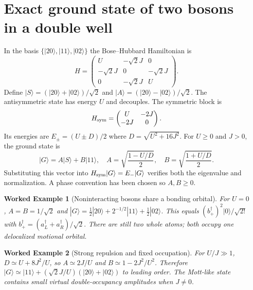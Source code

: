\documentclass[11pt,a4paper]{article}
\newtheorem{example}{Worked Example}
\begin{document}
\section{Exact ground state of two bosons in a double well}
In the basis $\{|20\rangle,|11\rangle,|02\rangle\}$ the Bose--Hubbard Hamiltonian is
\begin{equation}H=\begin{pmatrix}U&-\sqrt2J&0\\-\sqrt2J&0&-\sqrt2J\\0&-\sqrt2J&U\end{pmatrix}.\end{equation}
Define $|S\rangle=(|20\rangle+|02\rangle)/\sqrt2$ and $|A\rangle=(|20\rangle-|02\rangle)/\sqrt2$. The antisymmetric state has energy $U$ and decouples. The symmetric block is
\begin{equation}H_{\rm sym}=\begin{pmatrix}U&-2J\\-2J&0\end{pmatrix}.\end{equation}
Its energies are $E_{\pm}=(U\pm D)/2$ where $D=\sqrt{U^2+16J^2}$. For $U\ge0$ and $J>0$, the ground state is
\begin{equation}\label{eq:ground}|G\rangle=A|S\rangle+B|11\rangle,\quad A=\sqrt{\frac{1-U/D}{2}},\quad B=\sqrt{\frac{1+U/D}{2}}.\end{equation}
Substituting this vector into $H_{\rm sym}|G\rangle=E_-|G\rangle$ verifies both the eigenvalue and normalization. A phase convention has been chosen so $A,B\ge0$.
\begin{example}[Noninteracting bosons share a bonding orbital]
For $U=0$, $A=B=1/\sqrt2$ and $|G\rangle=\tfrac12|20\rangle+2^{-1/2}|11\rangle+\tfrac12|02\rangle$. This equals $(b_+^\dagger)^2|0\rangle/\sqrt{2!}$ with $b_+^\dagger=(a_L^\dagger+a_R^\dagger)/\sqrt2$. There are still two whole atoms; both occupy one delocalized motional orbital.
\end{example}
\begin{example}[Strong repulsion and fixed occupation]
For $U/J\gg1$, $D\simeq U+8J^2/U$, so $A\simeq2J/U$ and $B\simeq1-2J^2/U^2$. Therefore $|G\rangle\simeq|11\rangle+(\sqrt2J/U)(|20\rangle+|02\rangle)$ to leading order. The Mott-like state contains small virtual double-occupancy amplitudes when $J\ne0$.
\end{example}
\end{document}
